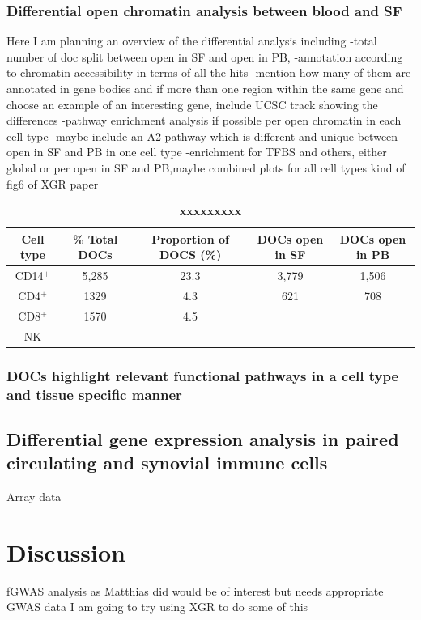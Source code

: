 \subsubsection{Differential open chromatin analysis between blood and SF}

Here I am planning an overview of the differential analysis including 
-total number of doc split between open in SF and open in PB,
-annotation according to chromatin accessibility in terms of all the hits
-mention how many of them are annotated in gene bodies and if more than one region within the same gene and choose an example of an interesting gene, include UCSC track showing the differences
-pathway enrichment analysis if possible per open chromatin in each cell type
-maybe include an A2 pathway which is different and unique between open in SF and PB in one cell type
-enrichment for TFBS and others, either global or per open in SF and PB,maybe combined plots for all cell types kind of fig6 of XGR paper


\begin{table}[htbp]
\centering
\begin{tabular}{@{} c c c c c}
\toprule
\textbf{Cell type} & \textbf{\% Total DOCs} &  \textbf{Proportion of DOCS (\%)} &\textbf{DOCs open in SF} & \textbf{DOCs open in PB} \\
\midrule
\midrule
CD14$^+$ & 5,285 & 23.3 & 3,779 & 1,506\\
CD4$^+$ & 1329 & 4.3 & 621 & 708\\
CD8$^+$ & 1570 & 4.5 &  & \\
NK      &  &  &  & \\
\bottomrule
\end{tabular}
\medskip %
\caption[Summary results of the chromatin accessibility analysis between SF and PB in PsA samples]{\textbf{xxxxxxxxx}}
\label{tab:PSA_DOCs_results}
\end{table}

\subsubsection{DOCs highlight relevant functional pathways in a cell type and tissue specific manner}


\subsection{Differential gene expression analysis in paired circulating and synovial immune cells}
Array data

\section{Discussion}
%


fGWAS analysis as Matthias did would be of interest but needs appropriate GWAS data
I am going to try using XGR to do some of this 



